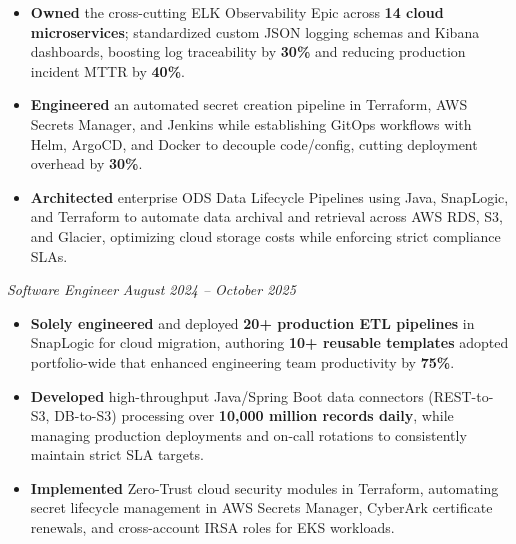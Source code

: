 \documentclass[10pt,a4paper]{article}
\begin{document}
\begin{itemize}

    \item \textbf{Owned} the cross-cutting ELK Observability Epic across \textbf{14 cloud microservices}; standardized custom JSON logging schemas and Kibana dashboards, boosting log traceability by \textbf{30\%} and reducing production incident MTTR by \textbf{40\%}.

    \item \textbf{Engineered} an automated secret creation pipeline in Terraform, AWS Secrets Manager, and Jenkins while establishing GitOps workflows with Helm, ArgoCD, and Docker to decouple code/config, cutting deployment overhead by \textbf{30\%}.

    \item \textbf{Architected} enterprise ODS Data Lifecycle Pipelines using Java, SnapLogic, and Terraform to automate data archival and retrieval across AWS RDS, S3, and Glacier, optimizing cloud storage costs while enforcing strict compliance SLAs.

\end{itemize}

\vspace{1pt}

\noindent \textit{Software Engineer} \hfill \textit{August 2024 -- October 2025}

\begin{itemize}

    \item \textbf{Solely engineered} and deployed \textbf{20+ production ETL pipelines} in SnapLogic for cloud migration, authoring \textbf{10+ reusable templates} adopted portfolio-wide that enhanced engineering team productivity by \textbf{75\%}.

    \item \textbf{Developed} high-throughput Java/Spring Boot data connectors (REST-to-S3, DB-to-S3) processing over \textbf{10,000 million records daily}, while managing production deployments and on-call rotations to consistently maintain strict SLA targets.

    \item \textbf{Implemented} Zero-Trust cloud security modules in Terraform, automating secret lifecycle management in AWS Secrets Manager, CyberArk certificate renewals, and cross-account IRSA roles for EKS workloads.

\end{itemize}

\vspace{1pt}
\end{document}
